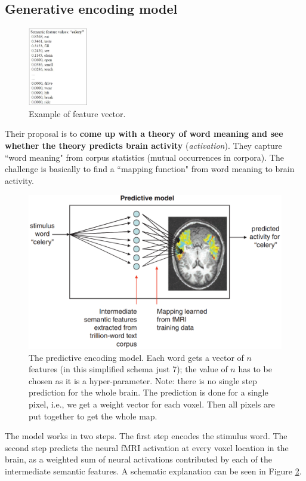 \subsection{Generative encoding model}
\begin{figure}
  \centering
  \includegraphics[width=0.23\textwidth]{images/mitchell_2.png}
  \caption{Example of feature vector.}
  \label{fig:mitchell_2}
\end{figure}
Their proposal is to \textbf{come up with a theory of word meaning and see whether the theory predicts brain activity} (\textit{activation}). They capture ``word meaning" from corpus statistics (mutual occurrences in corpora). The challenge is basically to find a ``mapping function" from word meaning to brain activity.
\begin{figure}
    \centering
    \captionsetup{width=.8\linewidth}
    \includegraphics[width=0.55\linewidth]{images/mitchell.png}
    \caption{The predictive encoding model. Each word gets a vector of $n$ features (in this simplified schema just 7); the value of $n$ has to be chosen as it is a hyper-parameter. Note: there is no single step prediction for the whole brain. The prediction is done for a single pixel, i.e., we get a weight vector for each voxel. Then all pixels are put together to get the whole map.}
    \label{fig:mitchell}
\end{figure}

The model works in two steps. The first step encodes the stimulus word.
The second step predicts the neural fMRI activation at every voxel location in the brain, as a weighted sum of neural activations contributed by each of the intermediate semantic features. A schematic explanation can be seen in Figure \ref{fig:mitchell}.

